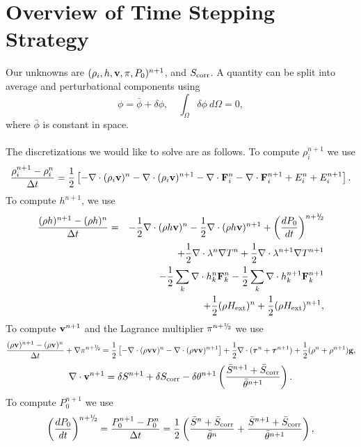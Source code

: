 \documentclass[final]{siamltex}
\newcommand{\sfrac}[2]{\mathchoice
  {\kern0em\raise.5ex\hbox{\the\scriptfont0 #1}\kern-.15em/
   \kern-.15em\lower.25ex\hbox{\the\scriptfont0 #2}}
  {\kern0em\raise.5ex\hbox{\the\scriptfont0 #1}\kern-.15em/
   \kern-.15em\lower.25ex\hbox{\the\scriptfont0 #2}}
  {\kern0em\raise.5ex\hbox{\the\scriptscriptfont0 #1}\kern-.2em/
   \kern-.15em\lower.25ex\hbox{\the\scriptscriptfont0 #2}}
  {#1\!/#2}}
\def\Fb {{\bf F}}
\def\gb {{\bf g}}
\def\vb {{\bf v}}
\def\taub   {\boldsymbol{\tau}}
\def\Hext {H_{\rm ext}}
\def\half   {\frac{1}{2}}
\def\myhalf {\sfrac{1}{2}}
\begin{document}
\section{Overview of Time Stepping Strategy}
Our unknowns are $(\rho_i,h,\vb,\pi,P_0)^{n+1}$, and $S_{\rm corr}$.  A quantity can
be split into average and perturbational components using
\begin{equation}
\phi = \bar\phi + \delta\phi, \quad \int_\Omega \delta\phi~d\Omega = 0,
\end{equation}
where $\bar\phi$ is constant in space.\\ \\
The discretizations we would like to solve are as follows.  To compute $\rho_i^{n+1}$ we use
\begin{equation}
\frac{\rho_i^{n+1} - \rho_i^n}{\Delta t} = \half\left[-\nabla\cdot(\rho_i\vb)^n -\nabla\cdot(\rho_i\vb)^{n+1} - \nabla\cdot\Fb_i^n - \nabla\cdot\Fb_i^{n+1} + E_i^n + E_i^{n+1}\right].
\end{equation}
To compute $h^{n+1}$, we use
\begin{eqnarray}
\frac{(\rho h)^{n+1} - (\rho h)^n}{\Delta t} &=& -\half\nabla\cdot(\rho h\vb)^n - \half\nabla\cdot(\rho h\vb)^{n+1} + \left(\frac{dP_0}{dt}\right)^{n+\myhalf}\nonumber\\
&&+ \half\nabla\cdot\lambda^n\nabla T^n + \half\nabla\cdot\lambda^{n+1}\nabla T^{n+1}\nonumber\\
&&- \half\sum_k\nabla\cdot h_k^n\Fb_k^n - \half\sum_k\nabla\cdot h_k^{n+1}\Fb_k^{n+1}\nonumber\\
&&+ \half(\rho\Hext)^n + \half(\rho\Hext)^{n+1},
\end{eqnarray}
To compute $\vb^{n+1}$ and the Lagrance multiplier $\pi^{n+\myhalf}$ we use
\begin{equation}
\frac{(\rho\vb)^{n+1} - (\rho\vb)^n}{\Delta t} + \nabla\pi^{n+\myhalf} = \half\left[-\nabla\cdot(\rho\vb\vb)^n - \nabla\cdot(\rho\vb\vb)^{n+1}\right] + \frac{1}{2}\nabla\cdot(\taub^n + \taub^{n+1}) + \frac{1}{2}(\rho^n + \rho^{n+1})\gb,
\end{equation}
\begin{equation}
\nabla\cdot\vb^{n+1} = \delta S^{n+1} + \delta S_{\rm corr} - \delta\theta^{n+1}\left(\frac{\bar{S}^{n+1} + \bar{S}_{\rm corr}}{\bar{\theta}^{n+1}}\right).\label{eq:div_constraint}
\end{equation}
To compute $P_0^{n+1}$ we use
\begin{equation}
\left(\frac{dP_0}{dt}\right)^{n+\myhalf} = \frac{P_0^{n+1} - P_0^n}{\Delta t} = \half\left(\frac{\bar S^n + \bar S_{\rm corr}}{\bar\theta^n} + \frac{\bar S^{n+1} + \bar S_{\rm corr}}{\bar\theta^{n+1}}\right),\label{eq:P0_update}
\end{equation}
\end{document}
